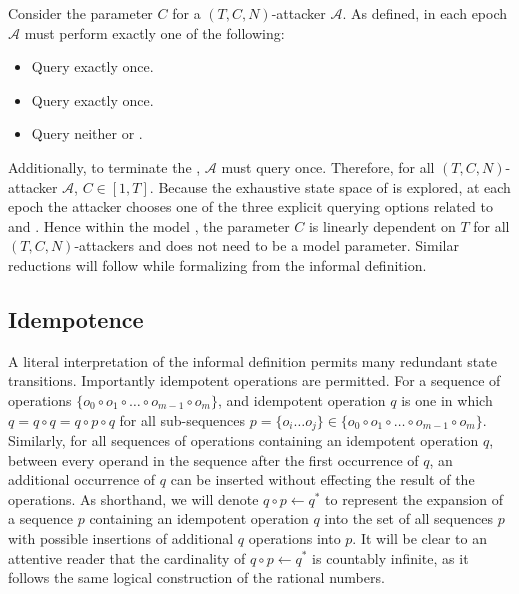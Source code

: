 Consider the parameter \(C\) for a \((T, C, N)\)-attacker \(\mathcal{A}\).
As defined, in each epoch \(\mathcal{A}\) must perform exactly one of the following:

\begin{itemize}
  \item Query  exactly once.
  \item Query   exactly once.
  \item Query neither  or .
\end{itemize}

Additionally, to terminate the \CGKAsec, \(\mathcal{A}\) must query  once.
Therefore, for all \((T, C, N)\)-attacker \(\mathcal{A}\), \(C \in [1, T]\).
Because the exhaustive state space of is explored, at each epoch the attacker chooses one of the three explicit querying options related to  and .
Hence within the model , the parameter \(C\) is linearly dependent on \(T\) for all \((T, C, N)\)-attackers and does not need to be a model parameter.
Similar reductions will follow while formalizing  from the informal \CGKAsec definition.


\hypertarget{sec:idempotence}{%
\subsection{Idempotence}\label{sec:idempotence}}

A literal interpretation of the informal \CGKAsec definition permits many redundant state transitions.
Importantly idempotent operations are permitted.
For a sequence of operations \( \{ o_0 \circ o_{1} \circ \ldots \circ o_{m-1} \circ o_{m} \} \), and idempotent operation \(q\) is one in which \(q = q \circ q = q \circ p \circ q\) for all sub-sequences \(p = \{o_i \ldots o_j \} \in \{ o_0 \circ o_{1} \circ \ldots \circ o_{m-1} \circ o_{m} \} \).
Similarly, for all sequences of operations containing an idempotent operation \(q\), between every operand in the sequence after the first occurrence of \(q\), an additional occurrence of \(q\) can be inserted without effecting the result of the operations.
As shorthand, we will denote \(q \circ p \gets q^{*}\) to represent the expansion of a sequence \(p\) containing an idempotent operation \(q\) into the set of all sequences \(p\) with possible insertions of additional \(q\) operations into \(p\).
It will be clear to an attentive reader that the cardinality of \(q \circ p \gets q^{*}\) is countably infinite, as it follows the same logical construction of the rational numbers.

